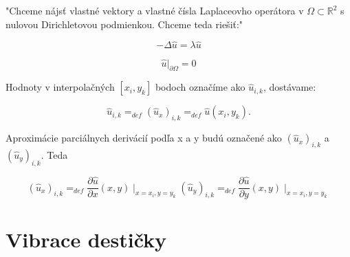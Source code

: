 \documentclass{beamer}
\begin{document}
\begin{frame}
    "Chceme nájsť vlastné vektory a vlastné čísla Laplaceovho operátora v $\Omega \subset \mathbb{R}^{2}$ s nulovou Dirichletovou podmienkou. Chceme teda riešiť:"

    \begin{subeqations}
    \label{eq:4}
    \begin{equation}
    \label{eq:5}
    -\Delta{\widehat{u}}=\lambda\widehat{u}
    \end{equation}

    \begin{equation}
    \label{eq:6}
    \widehat{u}|_{\partial{\Omega}}=0
    \end{equation}

    \end{subeqations}




    Hodnoty  v interpolačných $[x_{i},y_{k}]$ bodoch označíme ako $\widehat{u}_{i,k}$, dostávame:

    \begin{equation}
    \label{eq:6}
    \widehat{u}_{i,k}=_{def}(\widehat{u}_{x})_{i,k}=_{def}\widehat{u}(x_i,y_k).
    \end{equation}

    Aproximácie parciálnych derivácií podľa x a y budú označené ako $(\widehat{u}_{x})_{i,k}$ a $(\widehat{u}_{y})_{i,k}$. Teda



    \begin{subequations}
    \label{eq:7}
    \begin{equation}
    \label{eq:8}
    (\widehat{u}_{x})_{i,k}=_{def}\frac{\partial \widehat{u} }{\partial x}(x,y)\mid_{x=x_i,y=y_k}
    \end{equation}
    \begin{equation}
    \label{eq:9}
    (\widehat{u}_{y})_{i,k}=_{def}\frac{\partial \widehat{u} }{\partial y}(x,y)\mid_{x=x_i,y=y_k}
    \end{equation}
    \end{subequations}
\end{frame}


\section*{Vibrace destičky}
\label{sec:desticka}
\end{document}
